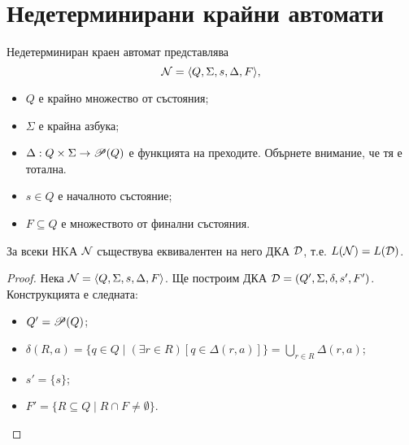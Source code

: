 \section{Недетерминирани крайни автомати}

\begin{dfn}
  Недетерминиран краен автомат представлява
  \[\mathcal{N} = \langle{Q,\Sigma,s,\Delta,F}\rangle,\]
  \begin{itemize}
  \item
    $Q$ е крайно множество от състояния;
  \item
    $\Sigma$ е крайна азбука;
  \item
    $\Delta: Q\times\Sigma \to \mathscr{P}(Q)$ е функцията на преходите.
    Обърнете внимание, че тя е тотална.
  \item
    $s \in Q$ е началното състояние;
  \item
    $F\subseteq Q$ е множеството от финални състояния.
  \end{itemize}
\end{dfn}

\begin{thm}
  За всеки НKА $\mathcal{N}$ съществува еквивалентен на него ДКА $\mathcal{D}$, т.е. $L(\mathcal{N}) = L(\mathcal{D})$.
\end{thm}
\begin{proof}
  Нека $\mathcal{N} = \langle{Q,\Sigma,s,\Delta,F}\rangle$. Ще построим ДКА $\mathcal{D} = (Q',\Sigma,\delta,s',F')$.
  Конструкцията е следната:
  \begin{itemize}
  \item
    $Q' = \mathscr{P}(Q)$;
  \item
    $\delta(R,a) = \{q\in Q\mid (\exists r\in R)[q\in\Delta(r,a)]\} = \bigcup_{r\in R}\Delta(r,a)$;
  \item
    $s' = \{s\}$;
  \item
    $F' = \{R \subseteq Q \mid R\cap F \neq \emptyset\}$.
  \end{itemize}
\end{proof}

